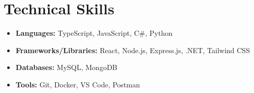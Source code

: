 \documentclass[a4paper,11pt]{article}
\begin{document}
\section*{Technical Skills}
\begin{itemize}[noitemsep,topsep=0pt]
    \item \textbf{Languages:} TypeScript, JavaScript, C\#, Python
    \item \textbf{Frameworks/Libraries:} React, Node.js, Express.js, .NET, Tailwind CSS
    \item \textbf{Databases:} MySQL, MongoDB
    \item \textbf{Tools:} Git, Docker, VS Code, Postman
\end{itemize}
\end{document}
